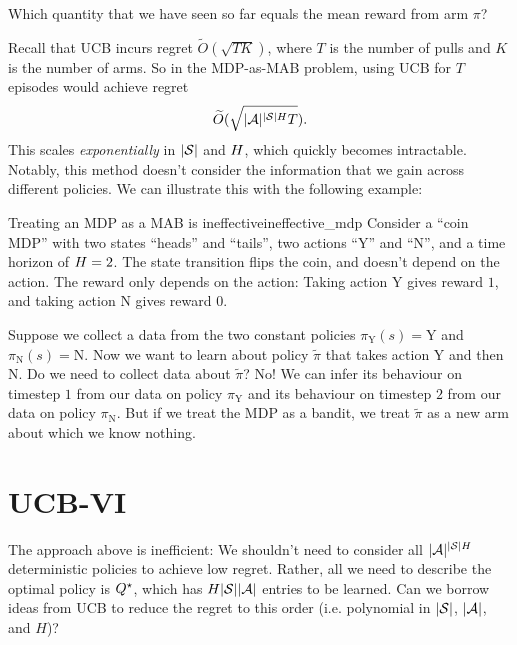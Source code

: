 \documentclass[\main/main]{subfiles}
\begin{document}
\begin{exercise}
    Which quantity that we have seen so far equals the mean reward from arm $\pi$?
\end{exercise}

Recall that UCB incurs regret $\tilde{O}(\sqrt{TK})$, where $T$ is the number of pulls and $K$ is the number of arms.
So in the MDP-as-MAB problem, using UCB for $T$ episodes would achieve regret
\begin{equation}
    \tilde{O}(\sqrt{|\A|^{|\S|\hor} T}).
    \label{eq:mdp_as_mab}
\end{equation}
This scales \emph{exponentially} in $|\S|$ and $\hor$, which quickly becomes intractable.
Notably, this method doesn't consider the information that we gain across different policies. We can illustrate this with the following example:

\begin{example}{Treating an MDP as a MAB is ineffective}{ineffective_mdp}
    Consider a ``coin MDP'' with two states ``heads'' and ``tails'', two actions ``Y'' and ``N'', and a time horizon of $\hor=2$.
    The state transition flips the coin, and doesn't depend on the action.
    The reward only depends on the action: Taking action Y gives reward $1$, and taking action N gives reward $0$.

    Suppose we collect a data from the two constant policies $\pi_{\text{Y}}(s) = \text{Y}$ and $\pi_{\text{N}}(s) = \text{N}$.
    Now we want to learn about policy $\tilde{\pi}$ that takes action Y and then N.
    Do we need to collect data about $\tilde{\pi}$?
    No! We can infer its behaviour on timestep $1$ from our data on policy $\pi_{\text{Y}}$ and its behaviour on timestep $2$ from our data on policy $\pi_{\text{N}}$.
    But if we treat the MDP as a bandit, we treat $\tilde{\pi}$ as a new arm about which we know nothing.
\end{example}



\section{UCB-VI}

The approach above is inefficient: We shouldn't need to consider all $|\A|^{|\S| H}$ deterministic policies to achieve low regret.
Rather, all we need to describe the optimal policy is $\Qopt$, which has $H |\S||\A|$ entries to be learned.
Can we borrow ideas from UCB to reduce the regret to this order (i.e. polynomial in $|\S|$, $|\A|$, and $H$)?
\end{document}
